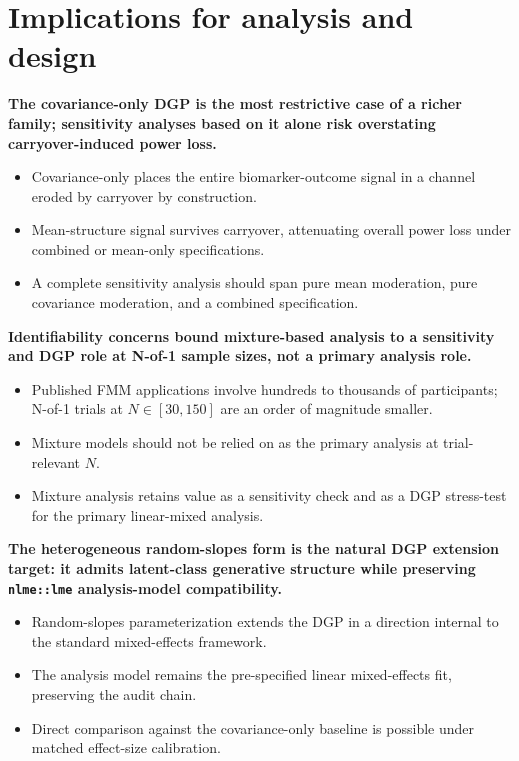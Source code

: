 \documentclass[
  11pt,
]{article}
\begin{document}
\section{Implications for analysis and design}\label{implications-for-analysis-and-design}

\textbf{The covariance-only DGP is the most restrictive case of a
richer family; sensitivity analyses based on it alone risk overstating
carryover-induced power loss.}

\begin{itemize}\setlength{\itemsep}{2pt}\setlength{\parskip}{0pt}
\item Covariance-only places the entire biomarker-outcome signal in a
  channel eroded by carryover by construction.
\item Mean-structure signal survives carryover, attenuating overall
  power loss under combined or mean-only specifications.
\item A complete sensitivity analysis should span pure mean
  moderation, pure covariance moderation, and a combined
  specification.
\end{itemize}

\textbf{Identifiability concerns bound mixture-based analysis to a
sensitivity and DGP role at N-of-1 sample sizes, not a primary
analysis role.}

\begin{itemize}\setlength{\itemsep}{2pt}\setlength{\parskip}{0pt}
\item Published FMM applications involve hundreds to thousands of
  participants; N-of-1 trials at $N \in [30,150]$ are an order of
  magnitude smaller.
\item Mixture models should not be relied on as the primary analysis
  at trial-relevant $N$.
\item Mixture analysis retains value as a sensitivity check and as
  a DGP stress-test for the primary linear-mixed analysis.
\end{itemize}

\textbf{The heterogeneous random-slopes form is the natural DGP
extension target: it admits latent-class generative structure while
preserving \texttt{nlme::lme} analysis-model compatibility.}

\begin{itemize}\setlength{\itemsep}{2pt}\setlength{\parskip}{0pt}
\item Random-slopes parameterization extends the DGP in a direction
  internal to the standard mixed-effects framework.
\item The analysis model remains the pre-specified linear mixed-effects
  fit, preserving the audit chain.
\item Direct comparison against the covariance-only baseline is
  possible under matched effect-size calibration.
\end{itemize}
\end{document}
